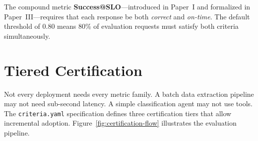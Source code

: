 \documentclass[11pt]{article}
\newcommand{\criteriayaml}{\texttt{criteria.yaml}}
\begin{document}
The compound metric \textbf{Success@SLO}---introduced in Paper~I and formalized in Paper~III---requires that each response be both \emph{correct} and \emph{on-time}. The default threshold of 0.80 means 80\% of evaluation requests must satisfy both criteria simultaneously.


\section{Tiered Certification}
\label{sec:tiers}

Not every deployment needs every metric family. A batch data extraction pipeline may not need sub-second latency. A simple classification agent may not use tools. The \criteriayaml{} specification defines three certification tiers that allow incremental adoption. Figure~\ref{fig:certification-flow} illustrates the evaluation pipeline.
\end{document}
